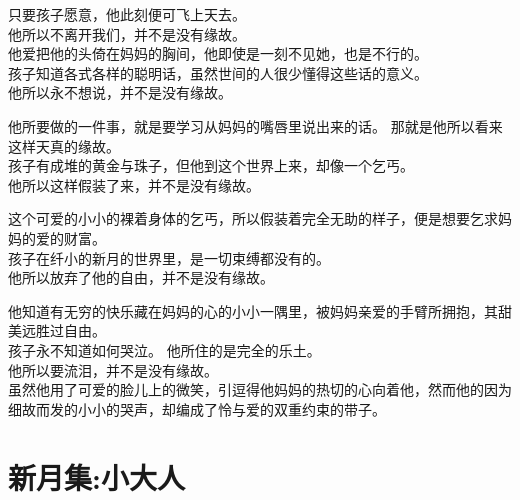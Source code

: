 \documentclass[]{book}
\renewenvironment{quote}{\begin{VF}}{\end{VF}}
\begin{document}
\begin{quote}
只要孩子愿意，他此刻便可飞上天去。\\
他所以不离开我们，并不是没有缘故。\\
他爱把他的头倚在妈妈的胸间，他即使是一刻不见她，也是不行的。\\
孩子知道各式各样的聪明话，虽然世间的人很少懂得这些话的意义。\\
他所以永不想说，并不是没有缘故。

他所要做的一件事，就是要学习从妈妈的嘴唇里说出来的话。
那就是他所以看来这样天真的缘故。\\
孩子有成堆的黄金与珠子，但他到这个世界上来，却像一个乞丐。\\
他所以这样假装了来，并不是没有缘故。

这个可爱的小小的裸着身体的乞丐，所以假装着完全无助的样子，便是想要乞求妈妈的爱的财富。\\
孩子在纤小的新月的世界里，是一切束缚都没有的。\\
他所以放弃了他的自由，并不是没有缘故。

他知道有无穷的快乐藏在妈妈的心的小小一隅里，被妈妈亲爱的手臂所拥抱，其甜美远胜过自由。\\
孩子永不知道如何哭泣。 他所住的是完全的乐土。\\
他所以要流泪，并不是没有缘故。\\
虽然他用了可爱的脸儿上的微笑，引逗得他妈妈的热切的心向着他，然而他的因为细故而发的小小的哭声，却编成了怜与爱的双重约束的带子。
\end{quote}

\section{新月集:小大人}
\end{document}

